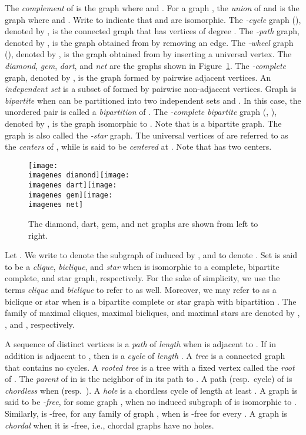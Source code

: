 \documentclass[a4paper, 11pt, oneside]{article}
\let\Definition=\emph
\def\imagenes{}
\begin{document}
The \Definition{complement} of  is the graph  where  and .  For a graph , the \Definition{union} of  and  is the graph  where  and .  Write  to indicate that  and  are isomorphic.  The \Definition{-cycle} graph (), denoted by , is the connected graph that has  vertices of degree .  The \Definition{-path} graph, denoted by , is the graph obtained from  by removing an edge.  The \emph{-wheel} graph (), denoted by , is the graph obtained from  by inserting a universal vertex.  The \Definition{diamond}, \Definition{gem}, \Definition{dart}, and \Definition{net} are the graphs shown in Figure~\ref{fig:diam-dart-gem}.  The \Definition{-complete} graph, denoted by , is the graph formed by  pairwise adjacent vertices.  An \Definition{independent set} is a subset of  formed by pairwise non-adjacent vertices.  Graph  is \Definition{bipartite} when  can be partitioned into two independent sets  and . In this case, the unordered pair  is called a \Definition{bipartition} of .  The \Definition{-complete bipartite} graph (, ), denoted by , is the graph isomorphic to .  Note that  is a bipartite graph.  The graph  is also called the \Definition{-star} graph.  The universal vertices of  are referred to as the \Definition{centers} of , while  is said to be \Definition{centered} at .  Note that  has two centers.  

\begin{figure}
 \hfill\texttt{[image: \\imagenes diamond]}\hfill\texttt{[image: \\imagenes dart]}\hfill\texttt{[image: \\imagenes gem]}\hfill{}\texttt{[image: \\imagenes net]}\hfill{}
 \caption{The diamond, dart, gem, and net graphs are shown from left to right.}\label{fig:diam-dart-gem}
\end{figure}


Let .  We write  to denote the subgraph of  induced by , and  to denote .  Set  is said to be a \Definition{clique}, \Definition{biclique}, and \Definition{star} when  is isomorphic to a complete, bipartite complete, and star graph, respectively.  For the sake of simplicity, we use the terms \Definition{clique} and \Definition{biclique} to refer to  as well.  Moreover, we may refer to  as a biclique or star when  is a bipartite complete or star graph with bipartition . The family of maximal cliques, maximal bicliques, and maximal stars are denoted by , , and , respectively. 

A sequence of distinct vertices  is a \Definition{path} of \Definition{length}  when  is adjacent to .  If in addition  is adjacent to , then  is a \Definition{cycle} of \Definition{length} .  A \Definition{tree} is a connected graph that contains no cycles.  A \Definition{rooted tree} is a tree  with a fixed vertex  called the \Definition{root} of .  The \Definition{parent} of  in  is the neighbor of  in its path to .  A path (resp.\ cycle) of  is \Definition{chordless} when  (resp.\ ).  A \Definition{hole} is a chordless cycle of length at least .  A graph  is said to be \Definition{-free}, for some graph , when no induced subgraph of  is isomorphic to .  Similarly,  is -free, for any family of graph , when  is -free for every .  A graph is \Definition{chordal} when it is -free, i.e., chordal graphs have no holes.  
\end{document}
